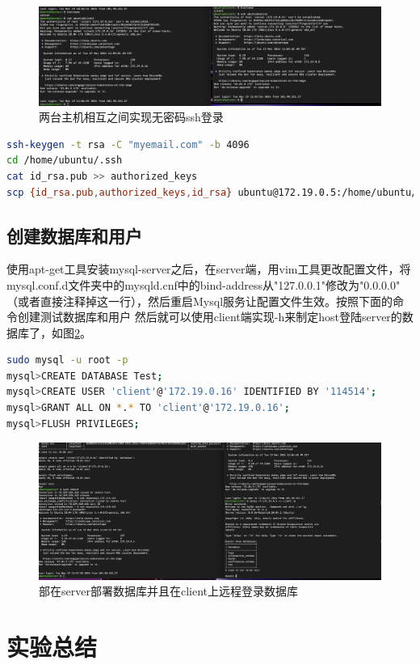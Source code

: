 \documentclass{article}
\begin{document}
\begin{figure}
    \centering
    \includegraphics[width=1.0\textwidth]{no_pwd_login.png}
    \caption{两台主机相互之间实现无密码ssh登录}
    \label{fig:3}
\end{figure}
\begin{lstlisting}[language=bash]
ssh-keygen -t rsa -C "myemail.com" -b 4096
cd /home/ubuntu/.ssh
cat id_rsa.pub >> authorized_keys
scp {id_rsa.pub,authorized_keys,id_rsa} ubuntu@172.19.0.5:/home/ubuntu/.ssh
\end{lstlisting}
\subsection{创建数据库和用户}
使用apt-get工具安装mysql-server之后，在server端，用vim工具更改配置文件，将mysql.conf.d文件夹中的mysqld.cnf中的bind-address从"127.0.0.1"修改为"0.0.0.0"
（或者直接注释掉这一行），然后重启Mysql服务让配置文件生效。按照下面的命令创建测试数据库和用户
然后就可以使用client端实现-h来制定host登陆server的数据库了，如图\ref{fig:4}。
\begin{lstlisting}[language=bash]
sudo mysql -u root -p
mysql>CREATE DATABASE Test;
mysql>CREATE USER 'client'@'172.19.0.16' IDENTIFIED BY '114514';
mysql>GRANT ALL ON *.* TO 'client'@'172.19.0.16';
mysql>FLUSH PRIVILEGES;
\end{lstlisting}
\begin{figure}[H]
    \centering
    \includegraphics[width=1.0\textwidth]{deploy_mysql.png}
    \caption{部在server部署数据库并且在client上远程登录数据库}
    \label{fig:4}
\end{figure}
\section{实验总结}
\indent 
\end{document}
